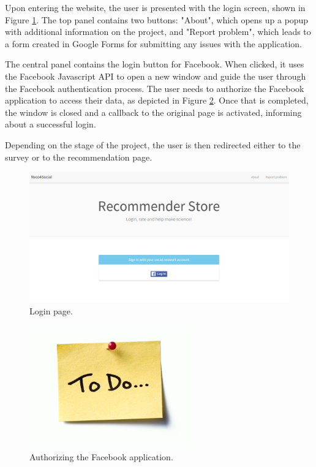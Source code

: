 \documentclass[12pt]{report}
\begin{document}
Upon entering the website, the user is presented with the login screen, shown in Figure \ref{fig.login}. The top panel contains two buttons: "About", which opens up a popup with additional information on the project, and "Report problem", which leads to a form created in Google Forms for submitting any issues with the application.

The central panel contains the login button for Facebook. When clicked, it uses the Facebook Javascript API to open a new window and guide the user through the Facebook authentication process. The user needs to authorize the Facebook application to access their data, as depicted in Figure \ref{fig.login.fb_app_auth}. Once that is completed, the window is closed and a callback to the original page is activated, informing about a successful login.

Depending on the stage of the project, the user is then redirected either to the survey or to the recommendation page. 

\begin{figure}[!t]
\centering
\includegraphics[width=\textwidth]{reco4_login.png} 
\caption[Login page.]{Login page.}
\label{fig.login}
\end{figure}

\begin{figure}[!t]
\centering
\includegraphics[width=7cm]{todo.jpg} 
\caption[Authorizing the Facebook application.]{Authorizing the Facebook application.}
\label{fig.login.fb_app_auth}
\end{figure}
\end{document}
